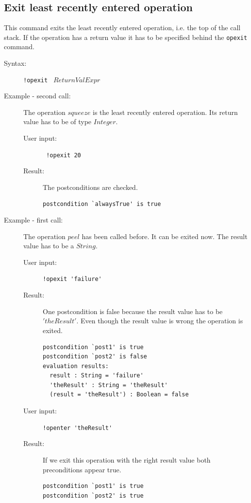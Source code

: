 \documentclass[a4paper,titlepage,oneside,final]{scrreprt} %
\begin{document}
\subsection{Exit least recently entered operation}
This command exits the least recently entered operation, i.e. the top of the call stack.
If the operation has a return value it has to be specified behind the \verb+opexit+ command.
\begin{description}
\item[Syntax:] \verb+!opexit + $\mathit{ReturnValExpr}$
\item[Example - second call:] The operation $\mathit{squeeze}$ is the least recently entered
operation. Its return value has to be of type $\mathit{Integer}$.
\begin{description}
\item[User input:] \verb+ !opexit 20+
\item[Result:] The postconditions are checked.
\begin{verbatim}
postcondition `alwaysTrue' is true
\end{verbatim}
\end{description}
\item[Example - first call:] The operation $\mathit{peel}$ has been called before.
It can be exited now. The result value has to be a $\mathit{String}$.
\begin{description}
\item[User input:] \verb+!opexit 'failure'+
\item[Result:] One postcondition is false because the result value has to be $'\mathit{theResult}'$.
Even though the result value is wrong the operation is exited.
\begin{verbatim}
postcondition `post1' is true
postcondition `post2' is false
evaluation results:
  result : String = 'failure'
  'theResult' : String = 'theResult'
  (result = 'theResult') : Boolean = false
\end{verbatim}
\item[User input:] \verb+!openter 'theResult'+
\item[Result:] If we exit this operation with the right result value both preconditions appear true.
\begin{verbatim}
postcondition `post1' is true
postcondition `post2' is true
\end{verbatim}
\end{description}
\end{description}
\end{document}
